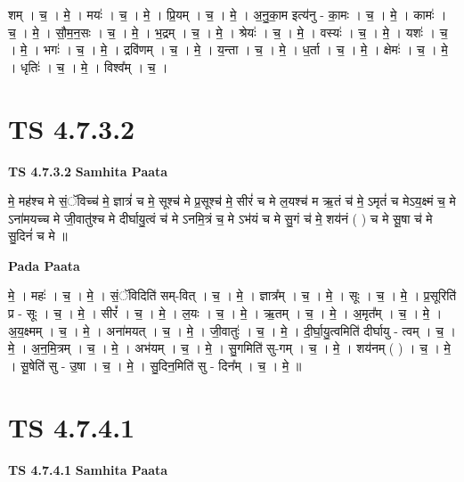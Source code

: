\documentclass[17pt]{extarticle}
\begin{document}
शम् । च॒ । मे॒ । मयः॑ । च॒ । मे॒ । प्रि॒यम् । च॒ । मे॒ । अ॒नु॒का॒म इत्य॑नु - का॒मः । च॒ । मे॒ । कामः॑ । च॒ । मे॒ । सौ॒म॒न॒सः । च॒ । मे॒ । भ॒द्रम् । च॒ । मे॒ । श्रेयः॑ । च॒ । मे॒ । वस्यः॑ । च॒ । मे॒ । यशः॑ । च॒ । मे॒ । भगः॑ । च॒ । मे॒ । द्रवि॑णम् । च॒ । मे॒ । य॒न्ता । च॒ । मे॒ । ध॒र्ता । च॒ । मे॒ । क्षेमः॑ । च॒ । मे॒ । धृतिः॑ । च॒ । मे॒ । विश्व᳚म् । च॒ ।  \newline




\section*{ TS 4.7.3.2 }

\textbf{TS 4.7.3.2 } \newline
\textbf{Samhita Paata} \newline

मे॒ मह॑श्च मे सं॒ॅविच्च॑ मे॒ ज्ञात्रं॑ च मे॒ सूश्च॑ मे प्र॒सूश्च॑ मे॒ सीरं॑ च मे ल॒यश्च॑ म ऋ॒तं च॑ मे॒ ऽमृतं॑ च मेऽय॒क्ष्मं च॒ मे ऽना॑मयच्च मे जी॒वातु॑श्च मे दीर्घायु॒त्वं च॑ मे ऽनमि॒त्रं च॒ मे ऽभ॑यं च मे सु॒गं च॑ मे॒ शय॑नं ( ) च मे सू॒षा च॑ मे सु॒दिनं॑ च मे ॥ \newline

\textbf{Pada Paata} \newline

मे॒ । महः॑ । च॒ । मे॒ । सं॒ॅविदिति॑ सम्-वित् । च॒ । मे॒ । ज्ञात्र᳚म् । च॒ । मे॒ । सूः । च॒ । मे॒ । प्र॒सूरिति॑ प्र - सूः । च॒ । मे॒ । सीरं᳚ । च॒ । मे॒ । ल॒यः । च॒ । मे॒ । ऋ॒तम् । च॒ । मे॒ । अ॒मृत᳚म् । च॒ । मे॒ । अ॒य॒क्ष्मम् । च॒ । मे॒ । अना॑मयत् । च॒ । मे॒ । जी॒वातुः॑ । च॒ । मे॒ । दी॒र्घा॒यु॒त्वमिति॑ दीर्घायु - त्वम् । च॒ । मे॒ । अ॒न॒मि॒त्रम् । च॒ । मे॒ । अभ॑यम् । च॒ । मे॒ । सु॒गमिति॑ सु-गम् । च॒ । मे॒ । शय॑नम् ( ) । च॒ । मे॒ । सू॒षेति॑ सु - उ॒षा । च॒ । मे॒ । सु॒दिन॒मिति॑ सु - दिन᳚म् । च॒ । मे॒ ॥  \newline




\section*{ TS 4.7.4.1 }

\textbf{TS 4.7.4.1 } \newline
\textbf{Samhita Paata} \newline
\end{document}
